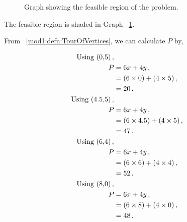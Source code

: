 \begin{subquestions}
\begin{subsubquestions}
\begin{figure}
	\caption{\label{2016:q2:graph:Graph1} Graph showing the feasible region of the problem.} 
\end{figure}


\subsubquestion

The feasible region is shaded in Graph ~\ref{2016:q2:graph:Graph1}.


\subsubquestion

From ~\ref{mod1:defn:TourOfVertices}, we can calculate $P$ by,

\begin{align}
	\text{Using (0,5)} \,, \nonumber \\
	P & = 6x + 4y \,, \nonumber \\
      & = (6 \times 0) + (4 \times 5) \,, \nonumber \\
	  & = 20 \,. \\
	\text{Using (4.5,5)} \,, \nonumber \\
	P & = 6x + 4y \,, \nonumber \\
	  & = (6 \times 4.5) + (4 \times 5) \,, \nonumber \\
	  & = 47 \,.    \\		  
	\text{Using (6,4)} \,, \nonumber \\
	P & = 6x + 4y \,, \nonumber \\
	  & = (6 \times 6) + (4 \times 4) \,, \nonumber \\
	  & = 52 \,. \label{2016:q2:eqn:Profit} \\
	\text{Using (8,0)} \,, \nonumber \\
	P & = 6x + 4y \,, \nonumber \\
	  & = (6 \times 8) + (4 \times 0) \,, \nonumber \\
	  & = 48 \,. 
\end{align}


\end{subsubquestions}
\end{subquestions}
